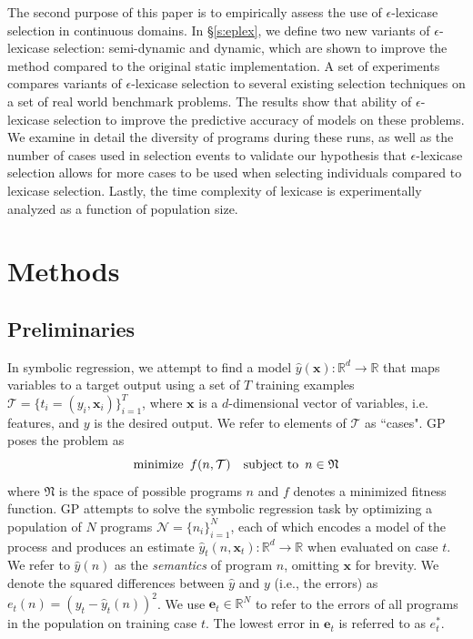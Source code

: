 \documentclass[twoside]{article}
\begin{document}
The second purpose of this paper is to empirically assess the use of $\epsilon$-lexicase selection in continuous domains. In \S\ref{s:eplex}, we define two new variants of $\epsilon$-lexicase selection: semi-dynamic and dynamic, which are shown to improve the method compared to the original static implementation. A set of experiments compares variants of $\epsilon$-lexicase selection to several existing selection techniques on a set of real world benchmark problems. The results show that ability of $\epsilon$-lexicase selection to improve the predictive accuracy of models on these problems. We examine in detail the diversity of programs during these runs, as well as the number of cases used in selection events to validate our hypothesis that $\epsilon$-lexicase selection allows for more cases to be used when selecting individuals compared to lexicase selection. Lastly, the time complexity of lexicase is experimentally analyzed as a function of population size.    

\section{Methods}
\subsection{Preliminaries}
In symbolic regression, we attempt to find a model $\hat{y}(\mathbf{x}): \mathbb{R}^d \rightarrow \mathbb{R}$ that maps variables to a target output using a set of $T$ training examples $\mathcal{T} = \{t_i = (y_i,\mathbf{x}_i)\}_{i=1}^T$, where $\mathbf{x}$ is a $d$-dimensional vector of variables, i.e. features, and $y$ is the desired output. We refer to elements of $\mathcal{T}$ as ``cases". GP poses the problem as
\begin{equation} \label{eq:gp}
\text{minimize} \hspace{0.5em} {f(n,\mathcal{T})} \hspace{1em} \text{subject to} \hspace{0.5em} {n \in \mathfrak{N}}
\end{equation}
where $\mathfrak{N}$ is the space of possible programs $n$ and $f$ denotes a minimized fitness function. GP attempts to solve the symbolic regression task by optimizing a population of $N$ programs $\mathcal{N} = \{n_i\}_{i=1}^N$, each of which encodes a model of the process and produces an estimate  $\hat{y}_t(n,\mathbf{x}_t): \mathbb{R}^d \rightarrow \mathbb{R}$ when evaluated on case $t$. We refer to $\hat{y}(n)$ as the {\it semantics} of program $n$, omitting $\mathbf{x}$ for brevity. We denote the squared differences between $\hat{y}$ and $y$ (i.e., the errors) as $e_t(n) = (y_t - \hat{y}_t(n))^2$.  We use $\mathbf{e}_t \in \mathbb{R}^N$ to refer to the errors of all programs in the population on training case $t$. The lowest error in $\mathbf{e}_t$ is referred to as $e^*_t$. 
\end{document}
